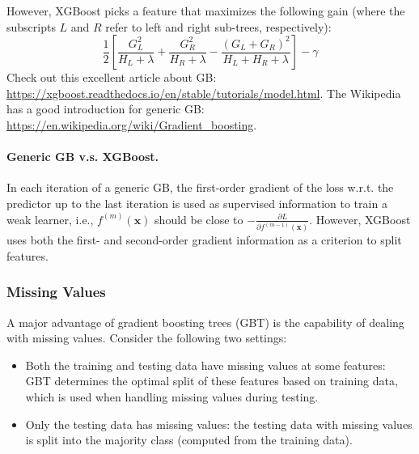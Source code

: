         However, XGBoost picks a feature that maximizes the following gain (where the subscripts $L$ and $R$ refer to left and right sub-trees, respectively):
            \begin{equation}
                \frac{1}{2}\left[ \frac{G_L^2}{H_L + \lambda} + \frac{G_R^2}{H_R + \lambda} - \frac{(G_L + G_R)^2}{H_L +  H_R + \lambda}  \right] - \gamma
            \end{equation}
        Check out this excellent article about GB: \url{https://xgboost.readthedocs.io/en/stable/tutorials/model.html}.
        The Wikipedia has a good introduction for generic GB: \url{https://en.wikipedia.org/wiki/Gradient_boosting}.
    
        
        \paragraph{Generic GB v.s. XGBoost.}
        In each iteration of a generic GB, the first-order gradient of the loss w.r.t. the predictor up to the last iteration is used as supervised information to train a weak learner, i.e., $f^{(m)}(\bm{x})$ should be close to $-\frac{\partial L}{\partial f^{(m-1)}(\bm{x})}$.
        However, XGBoost uses both the first- and second-order gradient information as a criterion to split features.
        
    \subsubsection{Missing Values}
        A major advantage of gradient boosting trees (GBT) is the capability of dealing with missing values.
        Consider the following two settings:
            \begin{itemize}
                \item Both the training and testing data have missing values at some features: GBT determines the optimal split of these features based on training data, which is used when handling missing values during testing.
                \item Only the testing data has missing values: the testing data with missing values is split into the majority class (computed from the training data).
            \end{itemize}

